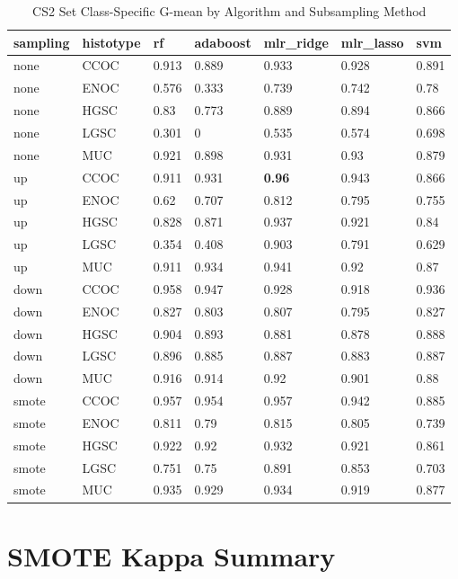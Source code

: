 \documentclass[
]{report}
\begin{document}
\begin{table}

\caption{\label{tab:cs2-gmean-class-table}CS2 Set Class-Specific G-mean by Algorithm and Subsampling Method}
\centering
\begin{tabular}[t]{l|l|l|l|l|l|l}
\hline
sampling & histotype & rf & adaboost & mlr\_ridge & mlr\_lasso & svm\\
\hline
none & CCOC & 0.913 & 0.889 & 0.933 & 0.928 & 0.891\\
\hline
none & ENOC & 0.576 & 0.333 & 0.739 & 0.742 & 0.78\\
\hline
none & HGSC & 0.83 & 0.773 & 0.889 & 0.894 & 0.866\\
\hline
none & LGSC & 0.301 & 0 & 0.535 & 0.574 & 0.698\\
\hline
none & MUC & 0.921 & 0.898 & 0.931 & 0.93 & 0.879\\
\hline
up & CCOC & 0.911 & 0.931 & \textbf{0.96} & 0.943 & 0.866\\
\hline
up & ENOC & 0.62 & 0.707 & 0.812 & 0.795 & 0.755\\
\hline
up & HGSC & 0.828 & 0.871 & 0.937 & 0.921 & 0.84\\
\hline
up & LGSC & 0.354 & 0.408 & 0.903 & 0.791 & 0.629\\
\hline
up & MUC & 0.911 & 0.934 & 0.941 & 0.92 & 0.87\\
\hline
down & CCOC & 0.958 & 0.947 & 0.928 & 0.918 & 0.936\\
\hline
down & ENOC & 0.827 & 0.803 & 0.807 & 0.795 & 0.827\\
\hline
down & HGSC & 0.904 & 0.893 & 0.881 & 0.878 & 0.888\\
\hline
down & LGSC & 0.896 & 0.885 & 0.887 & 0.883 & 0.887\\
\hline
down & MUC & 0.916 & 0.914 & 0.92 & 0.901 & 0.88\\
\hline
smote & CCOC & 0.957 & 0.954 & 0.957 & 0.942 & 0.885\\
\hline
smote & ENOC & 0.811 & 0.79 & 0.815 & 0.805 & 0.739\\
\hline
smote & HGSC & 0.922 & 0.92 & 0.932 & 0.921 & 0.861\\
\hline
smote & LGSC & 0.751 & 0.75 & 0.891 & 0.853 & 0.703\\
\hline
smote & MUC & 0.935 & 0.929 & 0.934 & 0.919 & 0.877\\
\hline
\end{tabular}
\end{table}

\hypertarget{smote-kappa-summary}{%
\section{SMOTE Kappa Summary}\label{smote-kappa-summary}}
\end{document}
